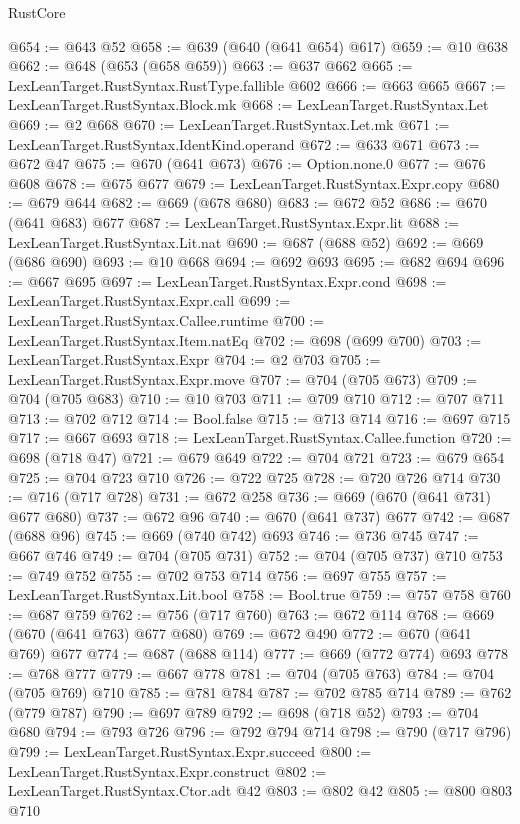 \begin{lexlean}{RustCore}
\begin{coremodule}
@654 := @643 @52
@658 := @639 (@640 (@641 @654) @617)
@659 := @10 @638
@662 := @648 (@653 (@658 @659))
@663 := @637 @662
@665 := LexLeanTarget.RustSyntax.RustType.fallible @602
@666 := @663 @665
@667 := LexLeanTarget.RustSyntax.Block.mk
@668 := LexLeanTarget.RustSyntax.Let
@669 := @2 @668
@670 := LexLeanTarget.RustSyntax.Let.mk
@671 := LexLeanTarget.RustSyntax.IdentKind.operand
@672 := @633 @671
@673 := @672 @47
@675 := @670 (@641 @673)
@676 := Option.none.{0}
@677 := @676 @608
@678 := @675 @677
@679 := LexLeanTarget.RustSyntax.Expr.copy
@680 := @679 @644
@682 := @669 (@678 @680)
@683 := @672 @52
@686 := @670 (@641 @683) @677
@687 := LexLeanTarget.RustSyntax.Expr.lit
@688 := LexLeanTarget.RustSyntax.Lit.nat
@690 := @687 (@688 @52)
@692 := @669 (@686 @690)
@693 := @10 @668
@694 := @692 @693
@695 := @682 @694
@696 := @667 @695
@697 := LexLeanTarget.RustSyntax.Expr.cond
@698 := LexLeanTarget.RustSyntax.Expr.call
@699 := LexLeanTarget.RustSyntax.Callee.runtime
@700 := LexLeanTarget.RustSyntax.Item.natEq
@702 := @698 (@699 @700)
@703 := LexLeanTarget.RustSyntax.Expr
@704 := @2 @703
@705 := LexLeanTarget.RustSyntax.Expr.move
@707 := @704 (@705 @673)
@709 := @704 (@705 @683)
@710 := @10 @703
@711 := @709 @710
@712 := @707 @711
@713 := @702 @712
@714 := Bool.false
@715 := @713 @714
@716 := @697 @715
@717 := @667 @693
@718 := LexLeanTarget.RustSyntax.Callee.function
@720 := @698 (@718 @47)
@721 := @679 @649
@722 := @704 @721
@723 := @679 @654
@725 := @704 @723 @710
@726 := @722 @725
@728 := @720 @726 @714
@730 := @716 (@717 @728)
@731 := @672 @258
@736 := @669 (@670 (@641 @731) @677 @680)
@737 := @672 @96
@740 := @670 (@641 @737) @677
@742 := @687 (@688 @96)
@745 := @669 (@740 @742) @693
@746 := @736 @745
@747 := @667 @746
@749 := @704 (@705 @731)
@752 := @704 (@705 @737) @710
@753 := @749 @752
@755 := @702 @753 @714
@756 := @697 @755
@757 := LexLeanTarget.RustSyntax.Lit.bool
@758 := Bool.true
@759 := @757 @758
@760 := @687 @759
@762 := @756 (@717 @760)
@763 := @672 @114
@768 := @669 (@670 (@641 @763) @677 @680)
@769 := @672 @490
@772 := @670 (@641 @769) @677
@774 := @687 (@688 @114)
@777 := @669 (@772 @774) @693
@778 := @768 @777
@779 := @667 @778
@781 := @704 (@705 @763)
@784 := @704 (@705 @769) @710
@785 := @781 @784
@787 := @702 @785 @714
@789 := @762 (@779 @787)
@790 := @697 @789
@792 := @698 (@718 @52)
@793 := @704 @680
@794 := @793 @726
@796 := @792 @794 @714
@798 := @790 (@717 @796)
@799 := LexLeanTarget.RustSyntax.Expr.succeed
@800 := LexLeanTarget.RustSyntax.Expr.construct
@802 := LexLeanTarget.RustSyntax.Ctor.adt @42
@803 := @802 @42
@805 := @800 @803 @710

\end{coremodule}
\end{lexlean}
